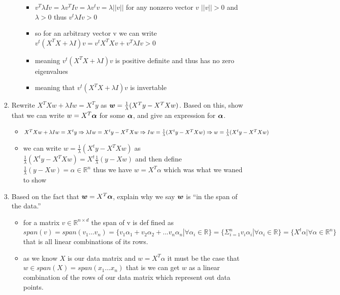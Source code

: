 \documentclass{article}
\theoremstyle{plain}
\theoremstyle{definition}
\begin{document}
\begin{enumerate}
\begin{itemize}
\begin{itemize}
        \item $v^T\lambda I v=\lambda v^TIv=\lambda v^tv=\lambda ||v||$ for any nonzero vector $v$ $||v||>0$ and $\lambda>0$ thus $v^t\lambda Iv>0 $
        \item so for an arbitrary vector v we can write $v^t(X^TX+\lambda I)v=v^{t}X^TXv+v^T\lambda I v>0$
        \item meaning $v^t(X^TX+\lambda I)v$ is positive definite and thus has no zero eigenvalues 
        \item meaning that $v^t(X^TX+\lambda I)v$ is invertable 
    \end{itemize}
\end{itemize}


\item Rewrite $X^{T}Xw+\lambda Iw=X^{T}y$ as $\boldsymbol{w}=\frac{1}{\lambda}(X^{T}y-X^{T}Xw)$.
Based on this, show that we can write $w=X^{T}\boldsymbol{\alpha}$ for some $\boldsymbol{\alpha}$,
and give an expression for $\boldsymbol{\alpha}$.\\

\begin{itemize}
    \color{blue}
    \item $X^TXw+\lambda Iw=X^ty\Rightarrow \lambda Iw=X^ty-X^TXw\Rightarrow Iw=\frac{1}{\lambda}(X^ty-X^TXw)\\\Rightarrow w=\frac{1}{\lambda}(X^ty-X^TXw)$
    \item we can write $ w=\frac{1}{\lambda}(X^ty-X^TXw)$ as $\frac{1}{\lambda}(X^ty-X^TXw)=X^t\frac{1}{\lambda }(y-Xw)$ and then define $\frac{1}{\lambda }(y-Xw)=\alpha\in \mathbb{R}^{n}$ thus we have $ w=X^{T}\alpha$ which was what we waned to show
\end{itemize}

\item Based on the fact that $\boldsymbol{w}=X^{T}\boldsymbol{\alpha}$, explain why we say $\boldsymbol{w}$ is ``in
the span of the data.''\\
\begin{itemize}
\color{blue}
    \item for a matrix $v\in \mathbb{R}^{n \times d}$ the span of v is def fined as $span(v)=span(v_1...v_n)=\{v_1\alpha_1+v_2\alpha_2+...v_n\alpha_n|\forall \alpha_{i}\in \mathbb{R}\}=\{\Sigma_{i=1}^{n}v_i\alpha_i|\forall \alpha_{i}\in \mathbb{R}\}=\{X^t\alpha|\forall \alpha\in \mathbb{R}^{n}\}$ that is all linear combinations of its rows. 
    \item as we know $X$ is our data matrix and $w=X^{T}\alpha$ it must be the case that $w\in span(X)=span(x_1...x_n)$ that is we can get $w$ as a linear combination of the rows of our data matrix which represent out data points.  
\end{itemize}


\end{enumerate}
\end{document}
